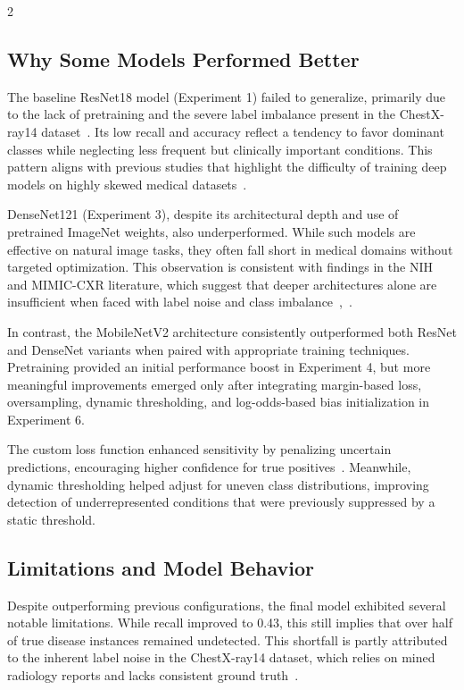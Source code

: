 \documentclass[12pt]{article}
\begin{document}
\begin{multicols}{2}
\subsection{Why Some Models Performed Better}
The baseline ResNet18 model (Experiment 1) failed to generalize, primarily due to the lack of pretraining and the severe label imbalance present in the ChestX-ray14 dataset~\cite{wang2017chestx}. Its low recall and accuracy reflect a tendency to favor dominant classes while neglecting less frequent but clinically important conditions. This pattern aligns with previous studies that highlight the difficulty of training deep models on highly skewed medical datasets~\cite{irvin2019chexpert}.

DenseNet121 (Experiment 3), despite its architectural depth and use of pretrained ImageNet weights, also underperformed. While such models are effective on natural image tasks, they often fall short in medical domains without targeted optimization. This observation is consistent with findings in the NIH and MIMIC-CXR literature, which suggest that deeper architectures alone are insufficient when faced with label noise and class imbalance~\cite{wang2017chestx},~\cite{johnson2019mimic}.

In contrast, the MobileNetV2 architecture consistently outperformed both ResNet and DenseNet variants when paired with appropriate training techniques. Pretraining provided an initial performance boost in Experiment 4, but more meaningful improvements emerged only after integrating margin-based loss, oversampling, dynamic thresholding, and log-odds-based bias initialization in Experiment 6.

The custom loss function enhanced sensitivity by penalizing uncertain predictions, encouraging higher confidence for true positives~\cite{13}. Meanwhile, dynamic thresholding helped adjust for uneven class distributions, improving detection of underrepresented conditions that were previously suppressed by a static threshold.

\subsection{Limitations and Model Behavior}
Despite outperforming previous configurations, the final model exhibited several notable limitations. While recall improved to 0.43, this still implies that over half of true disease instances remained undetected. This shortfall is partly attributed to the inherent label noise in the ChestX-ray14 dataset, which relies on mined radiology reports and lacks consistent ground truth~\cite{wang2017chestx}.


\end{multicols}
\end{document}
